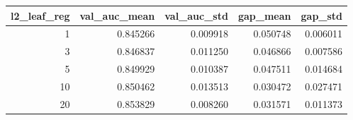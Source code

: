 \begin{tabular}{rrrrr}
\toprule
l2_leaf_reg & val_auc_mean & val_auc_std & gap_mean & gap_std \\
\midrule
1 & 0.845266 & 0.009918 & 0.050748 & 0.006011 \\
3 & 0.846837 & 0.011250 & 0.046866 & 0.007586 \\
5 & 0.849929 & 0.010387 & 0.047511 & 0.014684 \\
10 & 0.850462 & 0.013513 & 0.030472 & 0.027471 \\
20 & 0.853829 & 0.008260 & 0.031571 & 0.011373 \\
\bottomrule
\end{tabular}
